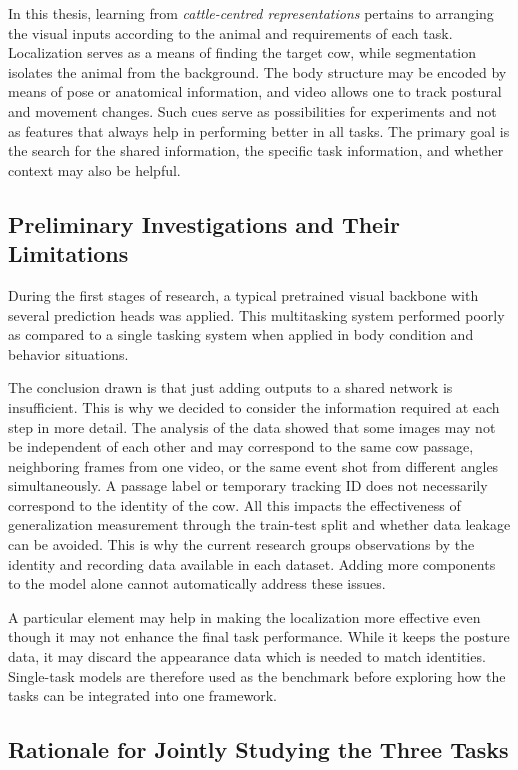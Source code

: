 In this thesis, learning from \emph{cattle-centred representations} pertains to arranging the visual inputs according to the animal and requirements of each task. Localization serves as a means of finding the target cow, while segmentation isolates the animal from the background. The body structure may be encoded by means of pose or anatomical information, and video allows one to track postural and movement changes. Such cues serve as possibilities for experiments and not as features that always help in performing better in all tasks. The primary goal is the search for the shared information, the specific task information, and whether context may also be helpful.

\subsection{Preliminary Investigations and Their Limitations}

During the first stages of research, a typical pretrained visual backbone with several prediction heads was applied. This multitasking system performed poorly as compared to a single tasking system when applied in body condition and behavior situations.

The conclusion drawn is that just adding outputs to a shared network is insufficient. This is why we decided to consider the information required at each step in more detail. The analysis of the data showed that some images may not be independent of each other and may correspond to the same cow passage, neighboring frames from one video, or the same event shot from different angles simultaneously. A passage label or temporary tracking ID does not necessarily correspond to the identity of the cow. All this impacts the effectiveness of generalization measurement through the train-test split and whether data leakage can be avoided. This is why the current research groups observations by the identity and recording data available in each dataset. Adding more components to the model alone cannot automatically address these issues.

A particular element may help in making the localization more effective even though it may not enhance the final task performance. While it keeps the posture data, it may discard the appearance data which is needed to match identities. Single-task models are therefore used as the benchmark before exploring how the tasks can be integrated into one framework.

\subsection{Rationale for Jointly Studying the Three Tasks}


